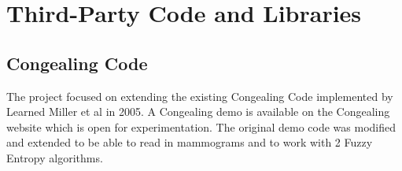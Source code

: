 \chapter{Third-Party Code and Libraries}







\section{Congealing Code}

The project focused on extending the existing Congealing Code implemented by Learned Miller et al in 2005. A Congealing demo is available on the Congealing website \cite{Learned-Miller} which is open for experimentation. The original demo code was modified and extended to be able to read in mammograms and to work with 2 Fuzzy Entropy algorithms.
